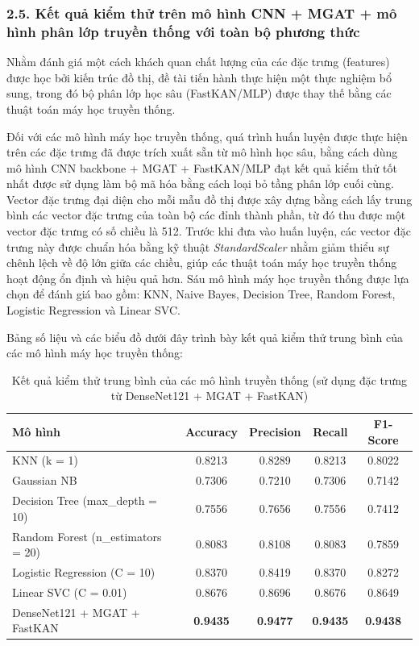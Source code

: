 \subsubsection{2.5. Kết quả kiểm thử trên mô hình CNN + MGAT + mô hình phân lớp truyền thống với toàn bộ phương thức}
\indent\indent Nhằm đánh giá một cách khách quan chất lượng của các đặc trưng (features) được học bởi kiến trúc đồ thị, đề tài tiến hành thực hiện một thực nghiệm bổ sung, trong đó bộ phân lớp học sâu (FastKAN/MLP) được thay thế bằng các thuật toán máy học truyền thống.\vspace{0.3cm}

Đối với các mô hình máy học truyền thống, quá trình huấn luyện được thực hiện trên các đặc trưng đã được trích xuất sẵn từ mô hình học sâu, bằng cách dùng mô hình CNN backbone + MGAT + FastKAN/MLP đạt kết quả kiểm thử tốt nhất được sử dụng làm bộ mã hóa bằng cách loại bỏ tầng phân lớp cuối cùng. Vector đặc trưng đại diện cho mỗi mẫu đồ thị được xây dựng bằng cách lấy trung bình các vector đặc trưng của toàn bộ các đỉnh thành phần, từ đó thu được một vector đặc trưng có số chiều là 512. Trước khi đưa vào huấn luyện, các vector đặc trưng này được chuẩn hóa bằng kỹ thuật \textit{StandardScaler} nhằm giảm thiểu sự chênh lệch về độ lớn giữa các chiều, giúp các thuật toán máy học truyền thống hoạt động ổn định và hiệu quả hơn. Sáu mô hình máy học truyền thống được lựa chọn để đánh giá bao gồm: KNN, Naive Bayes, Decision Tree, Random Forest, Logistic Regression và Linear SVC.\vspace{0.3cm}

\newpage
Bảng số liệu và các biểu đồ dưới đây trình bày kết quả kiểm thử trung bình của các mô hình máy học truyền thống:
\begin{table}[H]
\centering
\caption{\centering Kết quả kiểm thử trung bình của các mô hình truyền thống (sử dụng đặc trưng từ DenseNet121 + MGAT + FastKAN)}
\label{tab:TraditionalModelsSummary}
\renewcommand{\arraystretch}{1.15}
\begin{tabular}{lcccc}
\hline
\textbf{Mô hình} & \textbf{Accuracy} & \textbf{Precision} & \textbf{Recall} & \textbf{F1-Score} \\
\hline
KNN (k = 1)                   & 0.8213 & 0.8289 & 0.8213 & 0.8022 \\
Gaussian NB                   & 0.7306 & 0.7210 & 0.7306 & 0.7142 \\
Decision Tree (max\_depth = 10) & 0.7556 & 0.7656 & 0.7556 & 0.7412 \\
Random Forest (n\_estimators = 20) & 0.8083 & 0.8108 & 0.8083 & 0.7859 \\
Logistic Regression (C = 10)      & 0.8370 & 0.8419 & 0.8370 & 0.8272 \\
Linear SVC (C = 0.01)             & 0.8676 & 0.8696 & 0.8676 & 0.8649 \\
\hline
{DenseNet121 + MGAT + FastKAN} & \textbf{0.9435} & \textbf{0.9477} & \textbf{0.9435} & \textbf{0.9438} \\
\hline
\end{tabular}
\end{table}


